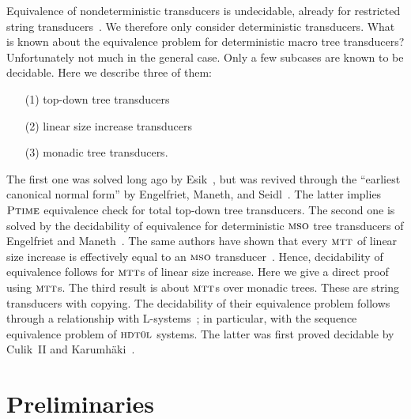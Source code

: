 \documentclass[copyright,creativecommons]{eptcs}
\newcommand{\mtt}{\textsc{mtt}}
\newcommand{\mso}{\textsc{mso}}
\newcommand{\hdtol}{\textsc{hdt{\small 0}l}}
\newcommand{\Ptime}{\textsc{Ptime}}
\begin{document}
Equivalence of nondeterministic transducers is undecidable,
already for restricted string transducers~\cite{DBLP:journals/jacm/Griffiths68}. 
We therefore only consider deterministic transducers.
What is known about the equivalence problem for 
deterministic macro tree transducers?
Unfortunately not much in the general case.
Only a few subcases are known to be decidable.
Here we describe three of them:
\begin{enumerate}
\item[(1)] top-down tree transducers
\item[(2)] linear size increase transducers
\item[(3)] monadic tree transducers.
\end{enumerate}
The first one was solved long ago by Esik~\cite{DBLP:journals/actaC/Esik81}, but
was revived through the ``earliest canonical normal form''
by Engelfriet, Maneth, and Seidl~\cite{DBLP:journals/jcss/EngelfrietMS09}. 
The latter implies $\Ptime$
equivalence check for total top-down tree transducers. 
The second one is solved by the decidability of equivalence 
for deterministic $\mso$ tree transducers of Engelfriet and Maneth~\cite{DBLP:journals/ipl/EngelfrietM06}.
The same authors have shown that every $\mtt$ of linear size increase
is effectively equal to an $\mso$ transducer~\cite{DBLP:journals/siamcomp/EngelfrietM03}. Hence,
decidability of equivalence follows for $\mtt$s of linear size increase.
Here we give a direct proof using $\mtt$s.
The third result is about $\mtt$s over monadic trees.
These are string transducers with copying. 
The decidability of their equivalence problem follows
through a relationship with L-systems~\cite{DBLP:journals/jcss/EngelfrietRS80};
in particular, with the sequence equivalence problem of $\hdtol$ systems.
The latter was first proved decidable by Culik~II and Karumh{\"a}ki~\cite{culkar86}.

\section{Preliminaries}
\end{document}
